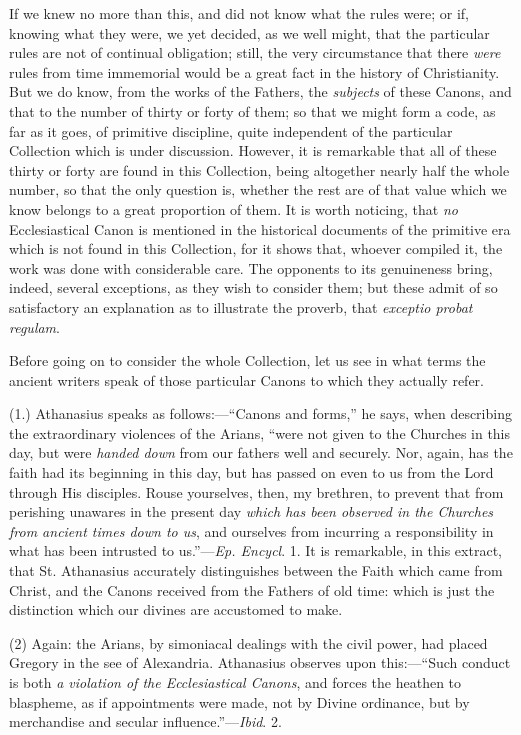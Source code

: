 If we knew no more than this, and did not know what the rules were;
or if, knowing what they were, we yet decided, as we well might, that
the particular rules are not of continual obligation; still, the very
circumstance that there \emph{were} rules from time immemorial would
be a great fact in the history of Christianity. But we do know, from
the works of the Fathers, the \emph{subjects} of these Canons, and
that to the number of thirty or forty of them; so that we might form a
code, as far as it goes, of primitive discipline, quite independent of
the particular Collection which is under discussion. However, it is
remarkable that all of these thirty or forty are found in this
Collection, being altogether nearly half the whole number, so that the
only question is, whether the rest are of that value which we know
belongs to a great proportion of them. It is worth noticing, that \emph{no}
Ecclesiastical Canon is mentioned in the historical documents of the
primitive era which is not found in this Collection, for it shows
that, whoever compiled it, the work was done with considerable care.
The opponents to its genuineness bring, indeed, several exceptions, as
they wish to consider them; but these admit of so satisfactory
an explanation as to illustrate the proverb, that \emph{exceptio probat
regulam}.

Before going on to consider the whole Collection, let us see in
what terms the ancient writers speak of those particular Canons to
which they actually refer.

(1.) Athanasius speaks as follows:—``Canons and forms,''
he says, when describing the extraordinary violences of the Arians,
``were not given to the Churches in this day, but were \emph{handed
down} from our fathers well and securely. Nor, again, has the faith
had its beginning in this day, but has passed on even to us from the
Lord through His disciples. Rouse yourselves, then, my brethren, to
prevent that from perishing unawares in the present day \emph{which has
been observed in the Churches from ancient times down to us}, and
ourselves from incurring a responsibility in what has been intrusted
to us.''—\emph{Ep. Encycl}. 1. It is remarkable, in this
extract, that St. Athanasius accurately distinguishes between the
Faith which came from Christ, and the Canons received from the Fathers
of old time: which is just the distinction which our divines are
accustomed to make.

(2) Again: the Arians, by simoniacal dealings with the civil power,
had placed Gregory in the see of Alexandria. Athanasius observes upon
this:—``Such conduct is both \emph{a violation of the
Ecclesiastical Canons}, and forces the heathen to blaspheme, as if
appointments were made, not by Divine ordinance, but by merchandise
and secular influence.''—\emph{Ibid}. 2.

